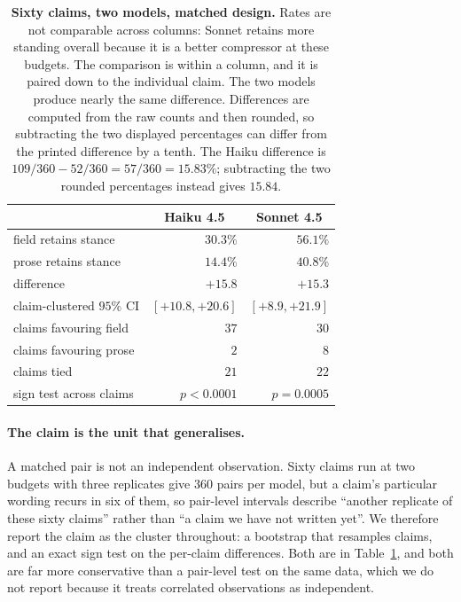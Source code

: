 \documentclass[11pt]{article}
\begin{document}
\begin{table}[t]
\centering\small
\begin{tabular}{@{}l r r@{}}
\toprule
& \multicolumn{1}{c}{Haiku 4.5} & \multicolumn{1}{c}{Sonnet 4.5} \\
\midrule
field retains stance      & $30.3\%$  & $56.1\%$ \\
prose retains stance      & $14.4\%$  & $40.8\%$ \\
difference                & $+15.8$   & $+15.3$ \\
\addlinespace
claim-clustered $95\%$ CI & $[+10.8, +20.6]$ & $[+8.9, +21.9]$ \\
claims favouring field    & $37$      & $30$ \\
claims favouring prose    & $2$       & $8$ \\
claims tied               & $21$      & $22$ \\
sign test across claims   & $p<0.0001$ & $p=0.0005$ \\
\bottomrule
\end{tabular}
\caption{\textbf{Sixty claims, two models, matched design.} Rates are not comparable
across columns: Sonnet retains more standing overall because it is a better compressor at
these budgets. The comparison is within a column, and it is paired down to the individual
claim. The two models produce nearly the same difference. Differences are computed from
the raw counts and then rounded, so subtracting the two displayed percentages can differ
from the printed difference by a tenth. The Haiku difference is $109/360-52/360=57/360
=15.83\%$; subtracting the two rounded percentages instead gives $15.84$.}
\label{tab:twocell}
\end{table}

\paragraph{The claim is the unit that generalises.} A matched pair is not an independent
observation. Sixty claims run at two budgets with three replicates give $360$ pairs per
model, but a claim's particular wording recurs in six of them, so pair-level intervals
describe ``another replicate of these sixty claims'' rather than ``a claim we have not
written yet''. We therefore report the claim as the cluster throughout: a bootstrap that
resamples claims, and an exact sign test on the per-claim differences. Both are in
Table~\ref{tab:twocell}, and both are far more conservative than a pair-level test on the
same data, which we do not report because it treats correlated observations as
independent.
\end{document}
